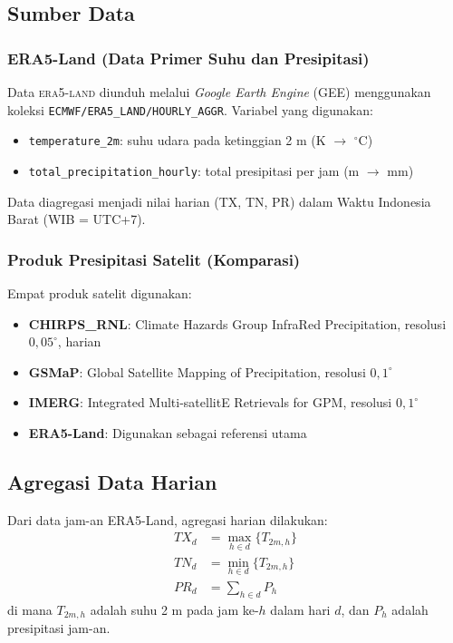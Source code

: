 \documentclass[12pt, a4paper]{article}
\newcommand{\degC}{$^{\circ}$C}
\newcommand{\era}{\textsc{era5-land}}
\begin{document}
\subsection{Sumber Data}

\subsubsection{ERA5-Land (Data Primer Suhu dan Presipitasi)}

Data \era{} diunduh melalui \textit{Google Earth Engine} (GEE) menggunakan koleksi \texttt{ECMWF/ERA5\_LAND/HOURLY\_AGGR}. Variabel yang digunakan:
\begin{itemize}
  \item \texttt{temperature\_2m}: suhu udara pada ketinggian 2 m (K $\to$ \degC{})
  \item \texttt{total\_precipitation\_hourly}: total presipitasi per jam (m $\to$ mm)
\end{itemize}
Data diagregasi menjadi nilai harian (TX, TN, PR) dalam Waktu Indonesia Barat (WIB = UTC+7).

\subsubsection{Produk Presipitasi Satelit (Komparasi)}

Empat produk satelit digunakan:
\begin{itemize}
  \item \textbf{CHIRPS\_RNL}: Climate Hazards Group InfraRed Precipitation, resolusi $0{,}05^{\circ}$, harian
  \item \textbf{GSMaP}: Global Satellite Mapping of Precipitation, resolusi $0{,}1^{\circ}$
  \item \textbf{IMERG}: Integrated Multi-satellitE Retrievals for GPM, resolusi $0{,}1^{\circ}$
  \item \textbf{ERA5-Land}: Digunakan sebagai referensi utama
\end{itemize}

\subsection{Agregasi Data Harian}

Dari data jam-an ERA5-Land, agregasi harian dilakukan:
\begin{align}
  TX_d &= \max_{h \in d}\{T_{2m,h}\} \\
  TN_d &= \min_{h \in d}\{T_{2m,h}\} \\
  PR_d &= \sum_{h \in d} P_h
\end{align}
di mana $T_{2m,h}$ adalah suhu 2 m pada jam ke-$h$ dalam hari $d$, dan $P_h$ adalah presipitasi jam-an.
\end{document}
